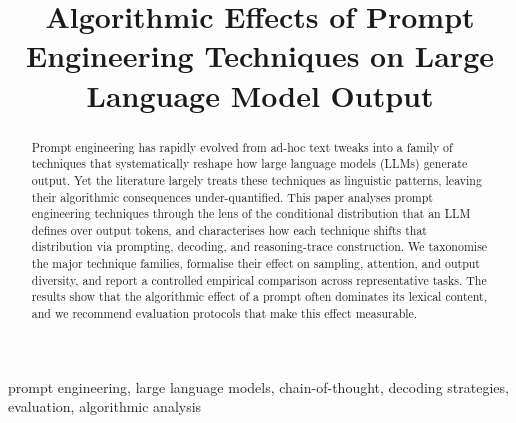 \documentclass[conference]{IEEEtran}
\begin{document}
\title{Algorithmic Effects of Prompt Engineering Techniques on Large Language Model Output}

\author{
\and
{}
\and
{}
}

\maketitle

\begin{abstract}
Prompt engineering has rapidly evolved from ad-hoc text tweaks into a family of techniques that systematically reshape how large language models (LLMs) generate output. Yet the literature largely treats these techniques as linguistic patterns, leaving their algorithmic consequences under-quantified. This paper analyses prompt engineering techniques through the lens of the conditional distribution that an LLM defines over output tokens, and characterises how each technique shifts that distribution via prompting, decoding, and reasoning-trace construction. We taxonomise the major technique families, formalise their effect on sampling, attention, and output diversity, and report a controlled empirical comparison across representative tasks. The results show that the algorithmic effect of a prompt often dominates its lexical content, and we recommend evaluation protocols that make this effect measurable.
\end{abstract}

\begin{IEEEkeywords}
prompt engineering, large language models, chain-of-thought, decoding strategies, evaluation, algorithmic analysis
\end{IEEEkeywords}
\end{document}
